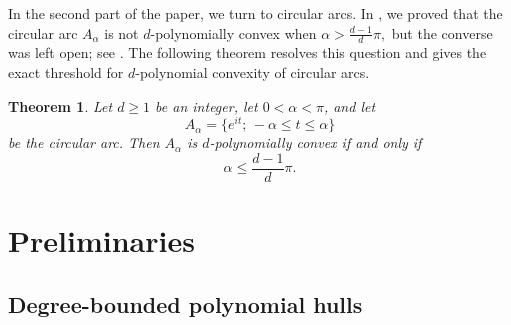 \documentclass[reqno]{amsart}
\newtheorem{theorem}{Theorem}[section]
\theoremstyle{definition}
\numberwithin{equation}{section}
\begin{document}
In the second part of the paper, we turn to circular arcs. In \cite[Proposition~16]{S}, we proved that the circular arc $A_\alpha$ is not $d$-polynomially convex when $\alpha>\frac{d-1}{d}\pi,$
but the converse was left open; see \cite[Remark~17]{S}. The following theorem resolves this question and gives the exact threshold for $d$-polynomial convexity of circular arcs.
\begin{theorem} \label{T3} 
Let $d\ge 1$ be an integer, let $0<\alpha<\pi$, and let
\[A_\alpha=\{e^{it};\,-\alpha\le t\le\alpha\}
\] 
be the circular arc. Then $A_\alpha$ is $d$-polynomially convex if and only if
\[\alpha\le\frac{d-1}{d}\pi.\]
\end{theorem}

\section{Preliminaries}
\subsection{Degree-bounded polynomial hulls}
\end{document}
